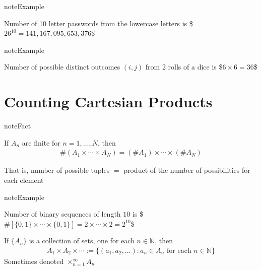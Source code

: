 \documentclass[letterpaper,10pt,english]{jupyterBook}
\begin{document}
\begin{sphinxadmonition}{note}{Example}

\sphinxAtStartPar
Number of 10 letter passwords from the lowercase letters  is
\$\(
26^{10} = 141,167,095,653,376
\)\$
\end{sphinxadmonition}

\begin{sphinxadmonition}{note}{Example}

\sphinxAtStartPar
Number of possible distinct outcomes \((i, j)\) from 2 rolls of a dice is
\$\(
6 \times 6 = 36
\)\$
\end{sphinxadmonition}


\section{Counting Cartesian Products}
\label{\detokenize{03.set_theory:counting-cartesian-products}}
\begin{sphinxadmonition}{note}{Fact}

\sphinxAtStartPar
If \(A_n\) are finite for \(n=1, \ldots,N\), then
\begin{equation*}
\begin{split}
\#(A_1 \times \cdots \times A_N) = (\# A_1) \times \cdots \times (\# A_N)
\end{split}
\end{equation*}\end{sphinxadmonition}

\sphinxAtStartPar
That is, number of possible tuples \(=\) product of the number of
possibilities for each element

\begin{sphinxadmonition}{note}{Example}

\sphinxAtStartPar
Number of binary sequences of length \(10\) is
\$\(
\# [\{0, 1\} \times \cdots \times \{0, 1\}]
= 2 \times \cdots \times 2 = 2^{10}
\)\$
\end{sphinxadmonition}

\sphinxAtStartPar
{}

\sphinxAtStartPar
If \(\{A_n\}\) is a collection of sets, one
for each \(n \in \mathbb{N}\), then
\begin{equation*}
\begin{split}
A_1 \times A_2 \times \cdots 
:= \{ (a_1, a_2, \ldots) : a_n \in A_n \text{ for each } n \in \mathbb{N} \}
\end{split}
\end{equation*}
\sphinxAtStartPar
Sometimes denoted \(\times_{n=1}^{\infty} A_n\)
\end{document}
